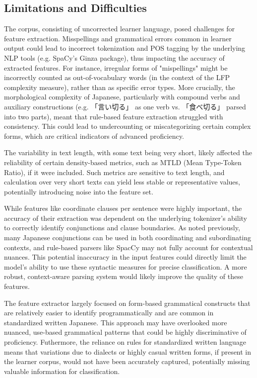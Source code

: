 \subsection{Limitations and Difficulties}
The corpus, consisting of uncorrected learner language, posed challenges for feature extraction. Misspellings and
grammatical errors common in learner output could lead to incorrect tokenization and POS tagging by the underlying
NLP tools (e.g. SpaCy's Ginza package), thus impacting the accuracy of extracted features. For instance, irregular
forms of "mispellings" might be incorrectly counted as out-of-vocabulary words (in the context of the LFP complexity
measure), rather than as specific error types. More crucially, the morphological complexity of Japanese,
particularly with compound verbs and auxiliary constructions (e.g. 「言い切る」 as one verb vs. 「食べ切る」 parsed into two
parts), meant that rule-based feature extraction struggled with consistency. This could lead to undercounting or
miscategorizing certain complex forms, which are critical indicators of advanced proficiency.

The variability in text length, with some text being very short, likely affected the reliability of certain
density-based metrics, such as MTLD (Mean Type-Token Ratio), if it were included. Such metrics are sensitive to text
length, and calculation over very short texts can yield less stable or representative values, potentially
introducing noise into the feature set.

While features like coordinate clauses per sentence were highly important, the accuracy of their extraction was
dependent on the underlying tokenizer's ability to correctly identify conjunctions and clause boundaries. As noted
previously, many Japanese conjunctions can be used in both coordinating and subordinating contexts, and rule-based
parsers like SpacCy may not fully account for contextual nuances. This potential inaccuracy in the input features
could directly limit the model's ability to use these syntactic measures for precise classification. A more robust,
context-aware parsing system would likely improve the quality of these features.

The feature extractor largely focused on form-based grammatical constructs that are relatively easier to identify
programmatically and are common in standardized written Japanese. This approach may have overlooked more nuanced,
use-based grammatical patterns that could be highly discriminative of proficiency. Futhermore, the reliance on rules
for standardized written language means that variations due to dialects or highly casual written forms, if present
in the learner corpus, would not have been accurately captured, potentially missing valuable information for
classification.

